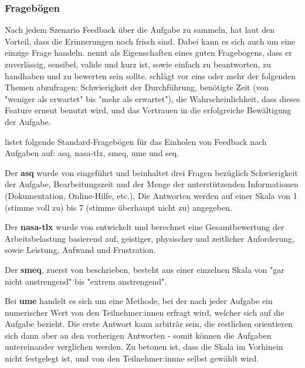 \subsubsection{Fragebögen}
Nach jedem Szenario Feedback über die Aufgabe zu sammeln, hat laut
\textcite{barnumUsabilityTesting2021} den Vorteil, dass die Erinnerungen noch frisch sind. Dabei
kann es sich auch um eine einzige Frage handeln. \textcite{sauroIfYou2010} nennt als Eigenschaften
eines guten Fragebogens, dass er zuverlässig, sensibel, valide und kurz ist, sowie einfach zu
beantworten, zu handhaben und zu bewerten sein sollte. \textcite{barnumUsabilityTesting2021} schlägt
vor eins oder mehr der folgenden Themen abzufragen: Schwierigkeit der Durchführung, benötigte Zeit
(von "weniger als erwartet" bis "mehr als erwartet"), die Wahrscheinlichkeit, dass dieses Feature
erneut benutzt wird, und das Vertrauen in die erfolgreiche Bewältigung der Aufgabe.

\textcite{sauroIfYou2010} listet folgende Standard-Fragebögen für das Einholen von Feedback nach
Aufgaben auf: \ac{asq}, \ac{nasa-tlx}, \ac{smeq}, \ac{ume} und \ac{seq}. 

Der \textbf{\ac{asq}} wurde von \textcite{lewisPsychometricEvaluation1991} eingeführt und beinhaltet
drei Fragen bezüglich Schwierigkeit der Aufgabe, Bearbeitungszeit und der Menge der unterstützenden
Informationen (Dokumentation, Online-Hilfe, etc.). Die Antworten werden auf einer Skala von 1
(stimme voll zu) bis 7 (stimme überhaupt nicht zu) angegeben.

Der \textbf{\ac{nasa-tlx}} wurde von \textcite{hartDevelopmentNASATLX1988} entwickelt und berechnet
eine Gesamtbewertung der Arbeitsbelastung basierend auf, geistiger, physischer und zeitlicher
Anforderung, sowie Leistung, Aufwand und Frustration.
\parencite{nasaNASATLX}

Der \textbf{\ac{smeq}}, zuerst von \textcite{zijlstraConstructionScale1985} beschrieben, besteht aus
einer einzelnen Skala von "gar nicht anstrengend" bis "extrem anstrengend".

Bei \textbf{\ac{ume}} handelt es sich um eine Methode, bei der nach jeder Aufgabe ein numerischer
Wert von den Teilnehmer:innen erfragt wird, welcher sich auf die Aufgabe bezieht. Die erste Antwort
kann arbiträr sein, die restlichen orientieren sich dann aber an den vorherigen
Antworten - somit können die Aufgaben untereinander verglichen werden. Zu
betonen ist, dass die Skala im Vorhinein nicht festgelegt ist, und von den
Teilnehmer:innne selbst gewählt wird.
\parencite{mcgeeUsabilityMagnitude2003}

